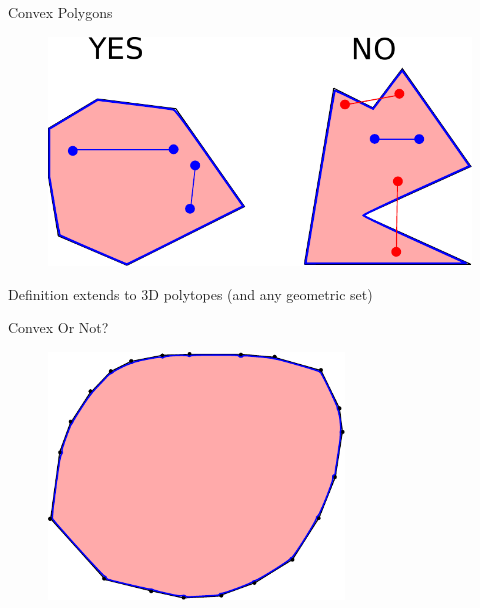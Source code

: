 \documentclass{beamer}
\begin{document}
\begin{frame}{Convex Polygons}

\begin{figure}[t]
	\centering
	\includegraphics[width=1\textwidth]{ConvexNonconvex.pdf}
\end{figure}

Definition extends to 3D polytopes (and any geometric set)

\end{frame}


\begin{frame}{Convex Or Not?}

\begin{figure}[t]
	\centering
	\includegraphics[width=0.7\textwidth]{ConvexNonconvex1.pdf}
\end{figure}

\end{frame}
\end{document}
